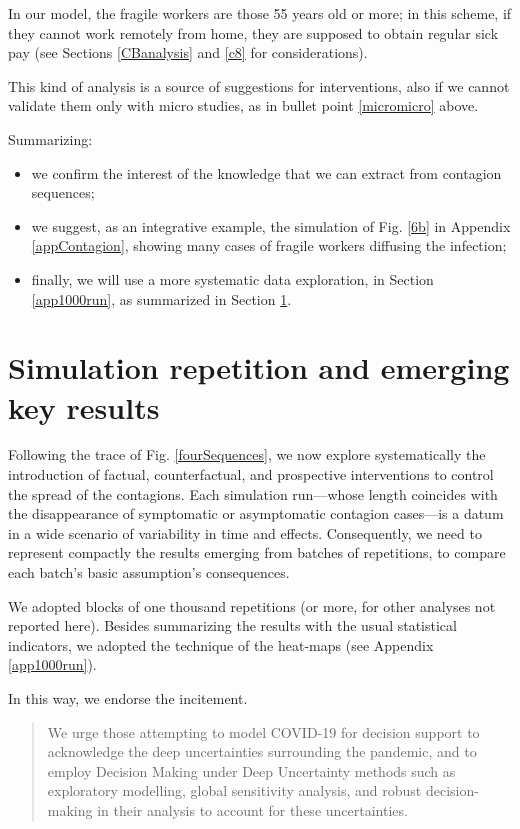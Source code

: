 \documentclass[graybox]{svmult}
\begin{document}
In our model, the fragile workers are those 55 years old or more; in this scheme, if they cannot work remotely from home, they are supposed to obtain regular sick pay (see Sections \ref{CBanalysis} and \ref{c8} for considerations).

This kind of analysis is a source of suggestions for interventions, also if we cannot validate them only with micro studies, as in bullet point \ref{micromicro} above. 

Summarizing: 

\begin{itemize}
\setlength{\itemsep}{0pt}
\item we confirm the interest of the knowledge that we can extract from contagion sequences; 
\item we suggest, as an integrative example, the simulation of Fig. \ref{6b}  in Appendix \ref{appContagion}, showing many cases of fragile workers diffusing the infection;
\item finally, we will use a more systematic data exploration, in Section \ref{app1000run}, as summarized in Section \ref{keyResultsS}.

\end{itemize}


\section{Simulation repetition and emerging key results}
\label{keyResultsS}

Following the trace of Fig. \ref{fourSequences}, we now explore systematically the introduction of factual, counterfactual, and prospective interventions to control the spread of the contagions. Each simulation run---whose length coincides with the disappearance of symptomatic or asymptomatic contagion cases---is a datum in a wide scenario of variability in time and effects. Consequently, we need to represent compactly the results emerging from batches of repetitions, to compare each batch's basic assumption's consequences.

We adopted blocks of one thousand repetitions (or more, for other analyses not reported here). Besides summarizing the results with the usual statistical indicators, we adopted the technique of the heat-maps (see Appendix \ref{app1000run}). 

In this way, we endorse the \cite{steinmann2020don} incitement.
\begin{quote}
We urge those attempting to model COVID-19 for decision support to acknowledge the deep uncertainties surrounding the pandemic, and to employ Decision Making under Deep Uncertainty methods such as exploratory modelling, global sensitivity analysis, and robust decision-making in their analysis to account for these uncertainties.
\end{quote}
\end{document}
